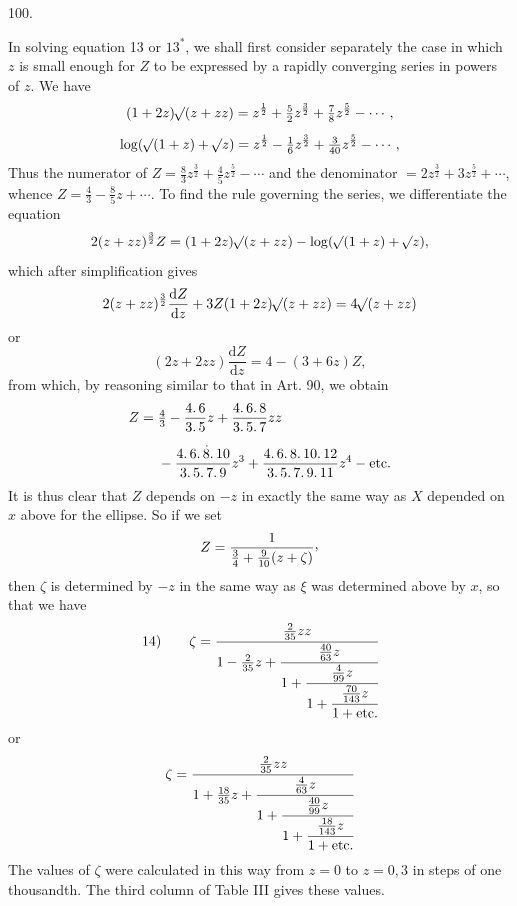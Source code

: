 \par{}\medskip
{}
\begin{center}100.\end{center}
In solving equation 13 or $13^*$, we shall first consider separately the case in which $z$ is small enough for $Z$ to be expressed by a rapidly converging series in powers of $z$. We have
\[
\begin{gathered}
(1+2z)\mathord{{}^{}\!\surd}(z+zz)=z^{\frac12}+\tfrac52z^{\frac32}+\tfrac78z^{\frac52}-\cdots,\\[.5em]
\log(\mathord{{}^{}\!\surd}(1+z)+\mathord{{}^{}\!\surd}z)=z^{\frac12}-\tfrac16z^{\frac32}+\tfrac3{40}z^{\frac52}-\cdots,
\end{gathered}
\]
\noindent Thus the numerator of $Z=\tfrac83z^{\frac32}+\tfrac45z^{\frac52}-\cdots$ and the denominator $=2z^{\frac32}+3z^{\frac52}+\cdots$, whence $Z=\tfrac43-\tfrac85z+\cdots$. To find the rule governing the series, we differentiate the equation
\[
2(z+zz)^{\frac32}Z=(1+2z)\mathord{{}^{}\!\surd}(z+zz)-\log(\mathord{{}^{}\!\surd}(1+z)+\mathord{{}^{}\!\surd}z),
\]
\noindent which after simplification gives
\[
2(z+zz)^{\frac32}\frac{\mathrm dZ}{\mathrm dz}+3Z(1+2z)\mathord{{}^{}\!\surd}(z+zz)=4\mathord{{}^{}\!\surd}(z+zz)
\]
\noindent or
\[
(2z+2zz)\frac{\mathrm dZ}{\mathrm dz}=4-(3+6z)Z,
\]
\noindent from which, by reasoning similar to that in Art. 90, we obtain
\[
\begin{aligned}
Z={}&\tfrac43-\frac{4\mathpunct{.}6}{3\mathpunct{.}5}z+\frac{4\mathpunct{.}6\mathpunct{.}8}{3\mathpunct{.}5\mathpunct{.}7}zz\\[.5em]
&-\frac{4\mathpunct{.}6\mathpunct{.}\overset{\mkern2mu .}{8}\mathpunct{.}10}{3\mathpunct{.}5\mathpunct{.}7\mathpunct{.}9}z^3+\frac{4\mathpunct{.}6\mathpunct{.}8\mathpunct{.}10\mathpunct{.}12}{3\mathpunct{.}5\mathpunct{.}7\mathpunct{.}9\mathpunct{.}11}z^4-\text{etc.}
\end{aligned}
\]
\noindent It is thus clear that $Z$ depends on $-z$ in exactly the same way as $X$ depended on $x$ above for the ellipse. So if we set
\[
Z=\frac1{\tfrac34+\tfrac9{10}(z+\zeta)}\mathpunct{\raisebox{.45ex}{,}}
\]
\noindent then $\zeta$ is determined by $-z$ in the same way as $\xi$ was determined above by $x$, so that we have
\[
\mathrm{14)}\qquad\zeta=\cfrac{\tfrac2{35}zz}{1-\tfrac2{35}z+\cfrac{\tfrac{40}{63}z}{1+\cfrac{\tfrac4{99}z}{1+\cfrac{\tfrac{70}{143}z}{1+\text{etc.}}}}}
\]
\noindent or
\[
\zeta=\cfrac{\tfrac2{35}zz}{1+\tfrac{18}{35}z+\cfrac{\tfrac4{63}z}{1+\cfrac{\tfrac{40}{99}z}{1+\cfrac{\tfrac{18}{143}z}{1+\text{etc.}}}}}
\]
\noindent{}The values of $\zeta$ were calculated in this way from $z=0$ to $z=0{,}3$ in steps of one thousandth. The third column of Table III gives these values.
